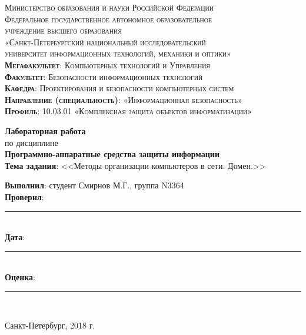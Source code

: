 \begin{titlepage}
	\begin{center}
		\textsc{
			\fontsize{12pt}{14pt}\selectfont
			Министерство образования и науки Российской Федерации\\
			Федеральное государственное автономное образовательное\\
			учреждение высшего образования\\
			«Санкт-Петербургский национальный исследовательский\\
			университет информационных технологий, механики и оптики»\\
			\textbf{Мегафакультет}:  Компьютерных технологий и Управления\\
			\textbf{Факультет}: Безопасности информационных технологий\\
			\textbf{Кафедра}: Проектирования и безопасности компьютерных систем\\
			\textbf{Направление (специальность)}: «Информационная безопасность»\\
			\textbf{Профиль}: 10.03.01 «Комплексная защита объектов информатизации»}
		
		\vfill
		
		\textbf{Лабораторная работа}\\
		по дисциплине\\
		\textbf{Программно-аппаратные средства защиты информации}\\
	\vfill
	\textbf{Тема задания}: <<Методы организации компьютеров в сети.
Домен.>>\\
	\end{center}

	\vfill
	
	\begin{flushright}
	\textbf{Выполнил}: студент Смирнов М.Г., группа N3364\\
	\textbf{Проверил}: \rule{10em}{.1pt}\\
		\vfill
	\textbf{Дата}: \rule{10em}{.1pt}\\
	\textbf{Оценка}: \rule{10em}{.1pt}\\

	\vfill
	


	\end{flushright}
	\vfill
	\begin{center}
		Санкт-Петербург, 2018 г.
	\end{center}
\end{titlepage}